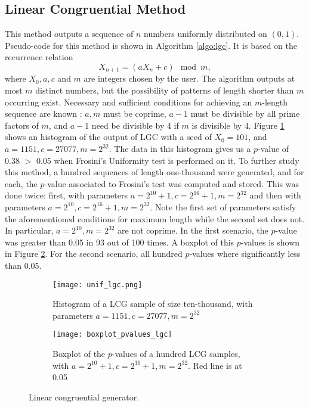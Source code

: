 \documentclass[letterpaper, 10 pt, conference]{article}
\begin{document}
\subsection{Linear Congruential Method}
This method outputs a sequence of $n$ numbers uniformly distributed on $(0,1)$.  Pseudo-code for this method is shown in Algorithm \ref{algo:lgc}. It is based on the recurrence relation 
\begin{equation}
X_{n+1} = (a X_n + c) \mod m,
\end{equation}
 where $X_0, a, c$ and $m$ are integers chosen by the user. The algorithm outputs at most $m$ distinct numbers, but the possibility of patterns of length shorter than $m$ occurring exist. Necessary and sufficient conditions for achieving an $m$-length sequence are known \cite{Hull_Dobell_1962}: $a, m$ must be coprime, $a-1$ must be divisible by all prime factors of $m$, and $a-1$ need be divisible by 4 if $m$ is divisible by 4. Figure \ref{fig:unif__lgc} shows an histogram of the output of \textsc{LGC} with a seed of $X_0= 101$, and $a = 1151, c = 27077, m = 2^{32}$. The data in this histogram gives us a $p$-value of 0.38 $>$ 0.05 when Frosini's Uniformity test \cite{Blinov_Lemeshko_2014} is performed on it.
To further study this method, a hundred sequences of length one-thousand were generated, and for each, the $p$-value associated to Frosini's test was computed and stored. This was done twice: first, with parameters $a = 2^{10} + 1, c = 2^{16} + 1, m = 2^{32}$ and then with parameters $a = 2^{10}, c = 2^{16} + 1, m = 2^{32}$. Note the first set of parameters satisfy the aforementioned conditions for maximum length while the second set does not. In particular, $a = 2^{10}, m = 2^{32}$ are not coprime. In the first scenario, the $p$-value was greater than 0.05 in 93 out of 100 times. A boxplot of this $p$-values is shown in Figure \ref{fig:boxplot_pvalues_lgc}. For the second scenario, all hundred $p$-values where significantly less than 0.05. 


 \begin{figure}
	\centering
	\begin{subfigure}[b]{0.45\linewidth}
		\texttt{[image: unif\_lgc.png]}
		\caption{Histogram of a \textsc{LCG} sample of size ten-thousand, with parameters $a = 1151, c=27077, m=2^{32}$}
		\label{fig:unif__lgc}
	\end{subfigure}
	\hfill
	\begin{subfigure}[b]{0.45\linewidth}
		\texttt{[image: boxplot\_pvalues\_lgc]}
		\caption{Boxplot of the $p$-values of a hundred \textsc{LCG} samples, with $a = 2^{10} + 1, c = 2^{16} + 1, m = 2^{32}$. Red line is at 0.05}
		\label{fig:boxplot_pvalues_lgc}
	\end{subfigure}
	\caption{Linear congruential generator.} 
	\label{fig:lgc}
\end{figure}
\end{document}
